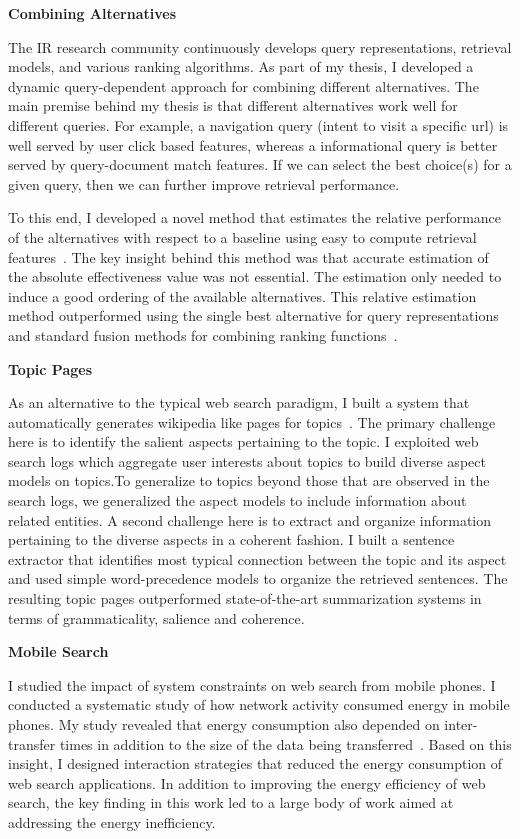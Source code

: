 \documentclass[a4paper,11pt,onecolumn]{article}
\begin{document}
{\bf Combining Alternatives}

The IR research community continuously develops query representations, retrieval models, and various ranking algorithms. As part of my thesis, I developed a dynamic query-dependent approach for combining different alternatives. The main premise behind my thesis is that different alternatives work well for different queries. For example, a navigation query (intent to visit a specific url) is well served by user click based features, whereas a informational query is better served by query-document match features. If we can select the best choice(s) for a given query, then we can further improve retrieval performance. 

To this end, I developed a novel method that estimates the relative performance of the alternatives with respect to a baseline using easy to compute retrieval features~\cite{balasubramanian-sigir10a}. The key insight behind this method was that accurate estimation of the absolute effectiveness value was not essential. The estimation only needed to induce a good ordering of the available alternatives. This relative estimation method outperformed using the single best alternative for query representations~\cite{balasubramanian-sigir10b} and standard fusion methods for combining ranking functions~\cite{balasubramanian-sigir10c}. 


{\bf Topic Pages}

As an alternative to the typical web search paradigm, I built a system that automatically generates wikipedia like pages for topics~\cite{balasubramanian-icsc2010}. The primary challenge here is to identify the salient aspects pertaining to the topic. I exploited web search logs which aggregate user interests about topics to build diverse aspect models on topics.To generalize to topics beyond those that are observed in the search logs, we generalized the aspect models to include information about related entities. A second challenge here is to extract and organize information pertaining to the diverse aspects in a coherent fashion. I built a sentence extractor that identifies most typical connection between the topic and its aspect and used simple word-precedence models to organize the retrieved sentences. The resulting topic pages outperformed state-of-the-art summarization systems in terms of grammaticality, salience and coherence.

{\bf Mobile Search}

I studied the impact of system constraints on web search from mobile phones. I conducted a systematic study of how network activity consumed energy in mobile phones. My study revealed that energy consumption also depended on inter-transfer times in addition to the size of the data being transferred~\cite{balasubramanian-imc09}. Based on this insight, I designed interaction strategies that reduced the energy consumption of web search applications. In addition to improving the energy efficiency of web search, the key finding in this work led to a large body of work aimed at addressing the energy inefficiency.
\end{document}
